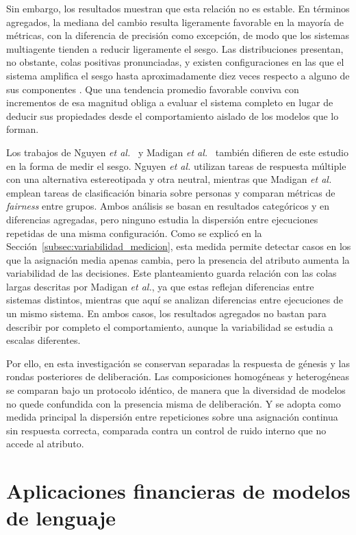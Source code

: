 Sin embargo, los resultados muestran que esta relación no es estable. En términos agregados, la mediana del cambio resulta ligeramente favorable en la mayoría de métricas, con la diferencia de precisión como excepción, de modo que los sistemas multiagente tienden a reducir ligeramente el sesgo. Las distribuciones presentan, no obstante, colas positivas pronunciadas, y existen configuraciones en las que el sistema amplifica el sesgo hasta aproximadamente diez veces respecto a alguno de sus componentes \cite{madigan2025emergent}. Que una tendencia promedio favorable conviva con incrementos de esa magnitud obliga a evaluar el sistema completo en lugar de deducir sus propiedades desde el comportamiento aislado de los modelos que lo forman.

Los trabajos de Nguyen \textit{et al.}~\cite{nguyen2025social} y Madigan \textit{et al.}~\cite{madigan2025emergent} también difieren de este estudio en la forma de medir el sesgo. Nguyen \textit{et al.} utilizan tareas de respuesta múltiple con una alternativa estereotipada y otra neutral, mientras que Madigan \textit{et al.} emplean tareas de clasificación binaria sobre personas y comparan métricas de \textit{fairness} entre grupos. Ambos análisis se basan en resultados categóricos y en diferencias agregadas, pero ninguno estudia la dispersión entre ejecuciones repetidas de una misma configuración. Como se explicó en la Sección~\ref{subsec:variabilidad_medicion}, esta medida permite detectar casos en los que la asignación media apenas cambia, pero la presencia del atributo aumenta la variabilidad de las decisiones. Este planteamiento guarda relación con las colas largas descritas por Madigan \textit{et al.}, ya que estas reflejan diferencias entre sistemas distintos, mientras que aquí se analizan diferencias entre ejecuciones de un mismo sistema. En ambos casos, los resultados agregados no bastan para describir por completo el comportamiento, aunque la variabilidad se estudia a escalas diferentes.

Por ello, en esta investigación se conservan separadas la respuesta de génesis y las rondas posteriores de deliberación. Las composiciones homogéneas y heterogéneas se comparan bajo un protocolo idéntico, de manera que la diversidad de modelos no quede confundida con la presencia misma de deliberación. Y se adopta como medida principal la dispersión entre repeticiones sobre una asignación continua sin respuesta correcta, comparada contra un control de ruido interno que no accede al atributo.


\section{Aplicaciones financieras de modelos de lenguaje}
\label{sec:aplicaciones_financieras}

